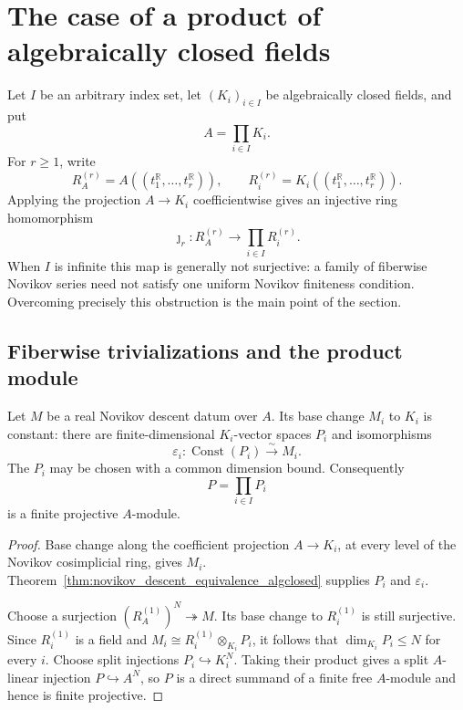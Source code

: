 \section{The case of a product of algebraically closed fields}
\label{sec:product_algebraically_closed}

Let $I$ be an arbitrary index set, let $(K_i)_{i\in I}$ be algebraically
closed fields, and put
\[
  A=\prod_{i\in I}K_i.
\]
For $r\geq 1$, write
\[
  R_A^{(r)}=A((t_1^{\mathbb{R}},\ldots,t_r^{\mathbb{R}})),
  \qquad
  R_i^{(r)}=K_i((t_1^{\mathbb{R}},\ldots,t_r^{\mathbb{R}})).
\]
Applying the projection $A\to K_i$ coefficientwise gives an injective ring
homomorphism
\[
  \jmath_r\colon R_A^{(r)}\longrightarrow\prod_{i\in I}R_i^{(r)}.
\]
When $I$ is infinite this map is generally not surjective: a family of
fiberwise Novikov series need not satisfy one uniform Novikov finiteness
condition.  Overcoming precisely this obstruction is the main point of the
section.

\subsection{Fiberwise trivializations and the product module}

\begin{lemma}
  \label{lem:product_fiber_constants}
  \leanok
  Let $M$ be a real Novikov descent datum over $A$.  Its base change $M_i$ to
  $K_i$ is constant: there are finite-dimensional $K_i$-vector spaces $P_i$
  and isomorphisms
  \[
    \varepsilon_i\colon \operatorname{Const}(P_i)\xrightarrow{\sim}M_i.
  \]
  The $P_i$ may be chosen with a common dimension bound.  Consequently
  \[
    P=\prod_{i\in I}P_i
  \]
  is a finite projective $A$-module.
\end{lemma}

\begin{proof}
  \leanok
  Base change along the coefficient projection $A\to K_i$, at every level of
  the Novikov cosimplicial ring, gives $M_i$.
  Theorem~\ref{thm:novikov_descent_equivalence_algclosed} supplies $P_i$ and
  $\varepsilon_i$.

  Choose a surjection $(R_A^{(1)})^N\twoheadrightarrow M$.  Its base change to
  $R_i^{(1)}$ is still surjective.  Since $R_i^{(1)}$ is a field and
  $M_i\cong R_i^{(1)}\otimes_{K_i}P_i$, it follows that
  $\dim_{K_i}P_i\leq N$ for every $i$.  Choose split injections
  $P_i\hookrightarrow K_i^N$.  Taking their product gives a split
  $A$-linear injection $P\hookrightarrow A^N$, so $P$ is a direct summand of a
  finite free $A$-module and hence is finite projective.
\end{proof}

